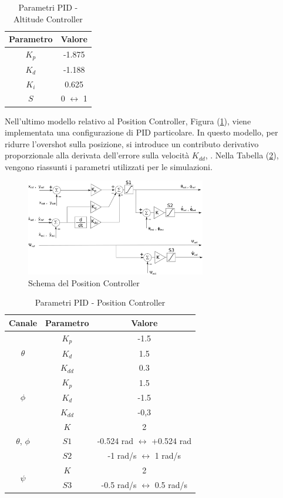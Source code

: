 \begin{table}
	\centering
	\begin{tabular}{c c}
		\hline
		Parametro & Valore \\
		\hline
		$K_p$ & -1.875 \\
		$K_d$ & -1.188\\
		$K_i$ & 0.625\\
		$S$ & 0 $\leftrightarrow$ 1\\
		\hline
	\end{tabular}	
	\caption{Parametri PID - Altitude Controller}
	\label{tab:PIDALT}
\end{table}

Nell'ultimo modello relativo al Position Controller, Figura (\ref{fig:PIDPosCTR}), viene implementata una configurazione di PID particolare. In questo modello, per ridurre l'overshot sulla posizione, si introduce un contributo derivativo proporzionale alla derivata dell'errore sulla velocità $K_{dd}$, \cite{DesTestCarm}. Nella Tabella (\ref{tab:PIDPOS}), vengono riassunti i parametri utilizzati per le simulazioni. 

\begin{figure}
	\centering
	\includegraphics[width=0.7\textwidth]{SistemaQuadrirotore/Figure/PIDPositionCtrl}
	\caption{Schema del Position Controller}
	\label{fig:PIDPosCTR}
\end{figure}

\begin{table}
	\centering
	\begin{tabular}{c c c}
		\hline
		 Canale & Parametro & Valore \\
		\hline
		\multirow{3}{*}{$\theta$}&$K_p$ & -1.5 \\
		&$K_d$ & 1.5\\
		&$K_{dd}$ & 0.3\\
		\hline
		\multirow{3}{*}{$\phi$}& $K_p$ & 1.5 \\
		&$K_d$ & -1.5\\
		&$K_{dd}$ & -0,3\\
		\hline
		\multirow{3}{*}{$\theta$, $\phi$}&$K$ & 2 \\ 
		&$S1$ & -0.524 rad $\leftrightarrow$ +0.524 rad\\
		&$S2$ & -1 rad/s $\leftrightarrow$ 1  rad/s\\
		\hline
		\multirow{2}{*}{$\psi$}&$K$ & 2 \\
		&$S3$ & -0.5 rad/s $\leftrightarrow$ 0.5 rad/s\\
		\hline
		
	\end{tabular}	
	\caption{Parametri PID - Position Controller}
	\label{tab:PIDPOS}
\end{table}

